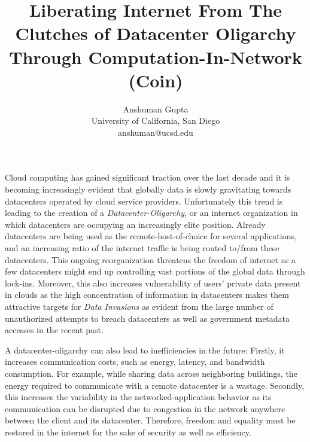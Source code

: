 \documentclass[twocolumn]{article}
\begin{document}
\title{Liberating Internet From The Clutches of Datacenter Oligarchy \\
Through Computation-In-Network (Coin)}
\author{Anshuman Gupta\\University of California, San Diego \\ anshuman@ucsd.edu}
\date{}

\maketitle

\thispagestyle{empty}
\pagestyle{empty}

\begin{comment}
The internet has altered computers forever. Computers are no longer standalone
machines but part of a global connected community that shares knowledge and
resources. This has led to the conception of entirely new ecosystems such as the
datacenter-centric cloud computing, internet-of-things etc.
\end{comment}

Cloud computing has gained significant traction over the last decade and it
is becoming increasingly evident that globally data is slowly gravitating towards
datacenters operated by cloud service providers. Unfortunately this trend is
leading to the creation of a \textit{Datacenter-Oligarchy}, or an internet
organization in which datacenters are occupying an increasingly elite position.
Already datacenters are being used as the remote-host-of-choice for several
applications, and an increasing ratio of the internet traffic is being routed
to/from these datacenters. This ongoing reorganization threatens the freedom
of internet as a few datacenters might end up controlling vast portions of the
global data through lock-ins. Moreover, this also increases vulnerability of
users' private data present in clouds as the high concentration of information
in datacenters makes them attractive targets for \textit{Data Invasions} as
evident from the large number of unauthorized attempts to breach datacenters
as well as government metadata accesses in the recent past.

A datacenter-oligarchy can also lead to inefficiencies in the future: Firstly,
it increases communication costs, such as energy, latency, and bandwidth consumption.
For example, while sharing data across neighboring buildings, the energy required
to communicate with a remote datacenter is a wastage. Secondly, this increases the
variability in the networked-application behavior as its communication can be
disrupted due to congestion in the network anywhere between the client and its
datacenter. Therefore, freedom and equality must be restored in the internet for
the sake of security as well as efficiency.
\end{document}
